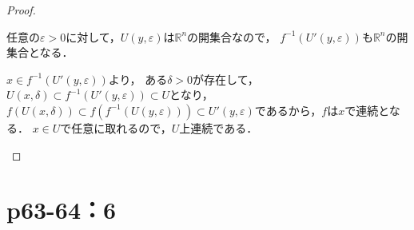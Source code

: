 \documentclass[a4paper,10pt,fleqn]{ltjsarticle}
\begin{document}
\begin{leftbar}
\begin{proof}
\begin{enumerate}[(I)]
        任意の$\varepsilon >0$に対して，$U(y,\varepsilon)$は$\mathbb{R}^n$の開集合なので，
        $f^{-1} (U'(y,\varepsilon))$も$\mathbb{R}^n$の開集合となる．
    
        $x \in f^{-1} (U'(y,\varepsilon))$より，
        ある$\delta >0$が存在して，$U(x,\delta) \subset  f^{-1}(U'(y,\varepsilon)) \subset U$となり，
        $f(U(x,\delta)) \subset f(f^{-1}(U(y,\varepsilon))) \subset U'(y,\varepsilon)$であるから，$f$は$x$で連続となる．
        $x \in U$で任意に取れるので，$U$上連続である．
        \end{enumerate}
      \end{proof}
    \end{leftbar}
    \newpage 

    
    \section*{p63-64：6}
\end{document}
